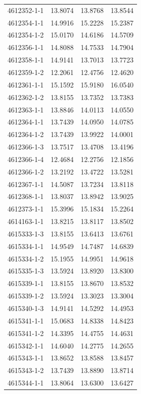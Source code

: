 \begin{longtable}{lrrr}
4612352-1-1 & 13.8074 & 13.8768 & 13.8544 \\
4612354-1-1 & 14.9916 & 15.2228 & 15.2387 \\
4612354-1-2 & 15.0170 & 14.6186 & 14.5709 \\
4612356-1-1 & 14.8088 & 14.7533 & 14.7904 \\
4612358-1-1 & 14.9141 & 13.7013 & 13.7723 \\
4612359-1-2 & 12.2061 & 12.4756 & 12.4620 \\
4612361-1-1 & 15.1592 & 15.9180 & 16.0540 \\
4612362-1-2 & 13.8155 & 13.7352 & 13.7383 \\
4612363-1-1 & 13.8846 & 14.0113 & 14.0550 \\
4612364-1-1 & 13.7439 & 14.0950 & 14.0785 \\
4612364-1-2 & 13.7439 & 13.9922 & 14.0001 \\
4612366-1-3 & 13.7517 & 13.4708 & 13.4196 \\
4612366-1-4 & 12.4684 & 12.2756 & 12.1856 \\
4612366-1-2 & 13.2192 & 13.4722 & 13.5281 \\
4612367-1-1 & 14.5087 & 13.7234 & 13.8118 \\
4612368-1-1 & 13.8037 & 13.8942 & 13.9025 \\
4612373-1-1 & 15.3996 & 15.1834 & 15.2264 \\
4614163-1-1 & 13.8215 & 13.8117 & 13.8502 \\
4615333-1-3 & 13.8155 & 13.6413 & 13.6761 \\
4615334-1-1 & 14.9549 & 14.7487 & 14.6839 \\
4615334-1-2 & 15.1955 & 14.9951 & 14.9618 \\
4615335-1-3 & 13.5924 & 13.8920 & 13.8300 \\
4615339-1-1 & 13.8155 & 13.8670 & 13.8532 \\
4615339-1-2 & 13.5924 & 13.3023 & 13.3004 \\
4615340-1-3 & 14.9141 & 14.5292 & 14.4953 \\
4615341-1-1 & 15.0683 & 14.8338 & 14.8423 \\
4615341-1-2 & 14.3395 & 14.4755 & 14.4631 \\
4615342-1-1 & 14.6040 & 14.2775 & 14.2655 \\
4615343-1-1 & 13.8652 & 13.8588 & 13.8457 \\
4615343-1-2 & 13.7439 & 13.8890 & 13.8714 \\
4615344-1-1 & 13.8064 & 13.6300 & 13.6427 \\

\end{longtable}

